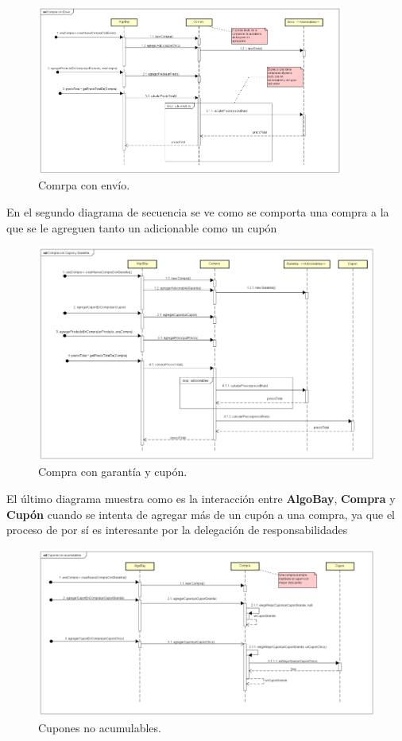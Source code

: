 \documentclass[titlepage,a4paper]{article}
\begin{document}
\begin{figure}[H]
\centering
\includegraphics[width=0.9\textwidth]{1compraconenvio.png}
\caption{\label{fig:seq01}Comrpa con envío.}
\end{figure}

En el segundo diagrama de secuencia se ve como se comporta una compra a la que se le agreguen tanto un adicionable como un cupón
\begin{figure}[H]
\centering
\includegraphics[width=1\textwidth]{2compraconenvioygarantia.png} 
\caption{\label{fig:seq02}Compra con garantía y cupón.}
\end{figure}

El último diagrama muestra como es la interacción entre \textbf{AlgoBay}, \textbf{Compra} y \textbf{Cupón} cuando se intenta de agregar más de un cupón a una compra, ya que el proceso de por sí es interesante por la delegación de responsabilidades

\begin{figure}[H]
\centering
\includegraphics[width=1\textwidth]{3cuponesnoacumulables.png} 
\caption{\label{fig:seq03}Cupones no acumulables.}
\end{figure}
\end{document}
